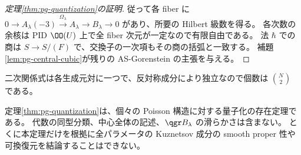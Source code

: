\begin{proof}[定理\ref{thm:pg-quantization}の証明]
従って各 fiber に
$0\to A_\lambda(-3)\xrightarrow{\Omega_\lambda}A_\lambda\to B_\lambda\to0$
があり、所要の Hilbert 級数を得る。
各次数の余核は PID $\OO(U)$ 上で全 fiber 次元が一定なので有限自由である。
法 $\hbar$ での商は $S\to S/(F)$ で、交換子の一次項もその商の括弧と一致する。
補題\ref{lem:pg-central-cubic}が残りの AS-Gorenstein の主張を与える。
\end{proof}
二次関係式は各生成元対に一つで、反対称成分により独立なので個数は $\binom N2$ である。
\begin{remark}\label{rem:pg-quantization-scope}
定理\ref{thm:pg-quantization}は、個々の Poisson 構造に対する量子化の存在定理である。
代数の同型分類、中心全体の記述、$\qgr B_\lambda$ の滑らかさは含まない。
とくに本定理だけを根拠に全パラメータの Kuznetsov 成分の smooth proper 性や可換復元を結論することはできない。
\end{remark}

